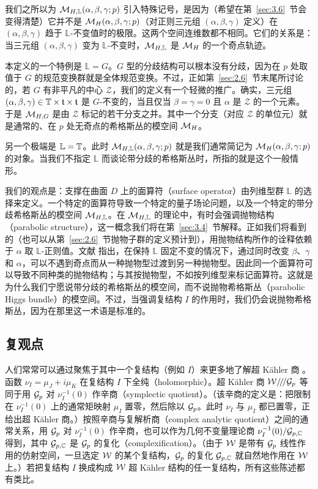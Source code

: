 我们之所以为 ${\mathcal{M}}_{H,\mathbb{L}}(\alpha,\beta,\gamma;p)$ 引入特殊记号，是因为（希望在第~\ref{sec:3.6}~节会变得清楚）它并不是 ${\mathcal{M}}_H(\alpha,\beta,\gamma;p)$（对正则三元组 $(\alpha,\beta,\gamma)$ 定义）在 $(\alpha,\beta,\gamma)$ 趋于 $\mathbb{L}$-不变值时的极限。这两个空间连维数都不相同。它们的关系是：当三元组 $(\alpha,\beta,\gamma)$ 变为 $\mathbb{L}$-不变时，${\mathcal{M}}_{H,\mathbb{L}}$ 是 ${{\mathcal{M}}_H}$ 的一个奇点轨迹。

本定义的一个特例是 $\mathbb{L}=G$。$G$ 型的分歧结构可以根本没有分歧，因为在 $p$ 处取值于 $G$ 的规范变换群就是全体规范变换。不过，正如第~\ref{sec:2.6}~节末尾所讨论的，若 $G$ 有非平凡的中心 ${\mathcal Z}$，我们的定义有一个轻微的推广。确实，三元组 $(\alpha,\beta,\gamma)
\in {\mathbb{T}}\times \mathfrak t\times \mathfrak t$ 是 $G$-不变的，当且仅当 $\beta=\gamma=0$ 且 $\alpha$ 是 ${\mathcal Z}$ 的一个元素。于是 ${\mathcal{M}}_{H,G}$ 是由 ${\mathcal Z}$ 标记的若干分支之并。其中一个分支（对应 $\mathcal Z$ 的单位元）就是通常的、在 $p$ 处无奇点的希格斯丛的模空间 ${{\mathcal{M}}_H}$。

另一个极端是 $\mathbb{L}={\mathbb{T}}$。此时 ${\mathcal{M}}_{H,\mathbb{L}}(\alpha,\beta,\gamma;p)$ 就是我们通常简记为 ${\mathcal{M}}_H(\alpha,\beta,\gamma;p)$ 的对象。当我们不指定 $\mathbb{L}$ 而谈论带分歧的希格斯丛时，所指的就是这个一般情形。

我们的观点是：支撑在曲面 $D$ 上的面算符（surface operator）由列维型群 $\mathbb{L}$ 的选择来定义。一个特定的面算符导致一个特定的量子场论问题，以及一个特定的带分歧希格斯丛的模空间 ${\mathcal{M}}_{H,\mathbb{L}}$。在 ${\mathcal{M}}_{H,\mathbb{L}}$ 的理论中，有时会强调抛物结构（parabolic structure），这一概念我们将在第~\ref{sec:3.4}~节解释。正如我们将看到的（也可以从第~\ref{sec:2.6}~节抛物子群的定义预计到），用抛物结构所作的诠释依赖于 $\alpha$ 取 $\mathbb{L}$-正则值。文献 \cite{ref24} 指出，在保持 $\mathbb{L}$ 固定不变的情况下，通过同时改变 $\beta$、$\gamma$ 和 $\alpha$，可以不遇到奇点而从一种抛物型过渡到另一种抛物型。因此同一个面算符可以导致不同种类的抛物结构；与其按抛物型，不如按列维型来标记面算符。这就是为什么我们宁愿说带分歧的希格斯丛的模空间，而不说抛物希格斯丛（parabolic Higgs bundle）的模空间。不过，当强调复结构 $I$ 的作用时，我们仍会说抛物希格斯丛，因为在那里这一术语是标准的。

\subsection{复观点}
\label{sec:3.2}

人们常常可以通过聚焦于其中一个复结构（例如 $I$）来更多地了解超 Kähler 商 \cite{ref49}。函数
 $\nu_I=\mu_J+i\mu_K$ 在复结构 $I$ 下全纯（holomorphic）。超 Kähler 商 $\mathcal{W}/\negthinspace/\negthinspace/\mathcal{G}_p$ 等同于用 $\mathcal{G}_p$ 对 $\nu_I^{-1}(0)$ 作辛商（symplectic quotient）。（该辛商的定义是：把限制在 $\nu_I^{-1}(0)$ 上的通常矩映射
$\mu_I$ 置零，然后除以 $\mathcal{G}_p$。此时 $\nu_I$ 与 $\mu_I$ 都已置零，正给出超 Kähler 商。）按照辛商与复解析商（complex analytic quotient）之间的通常关系，用 $\mathcal{G}_p$ 对 $\nu_I^{-1}(0)$ 作辛商，也可以作为几何不变量理论商 $\nu_I^{-1}(0)/\mathcal{G}_{p,{\mathbb{C}}}$ 得到，其中 $\mathcal{G}_{p,{\mathbb{C}}}$ 是 $\mathcal{G}_p$ 的复化（complexification）。（由于
$\mathcal{W}$ 是带有 $\mathcal{G}_p$ 线性作用的仿射空间，一旦选定 $\mathcal{W}$ 的某个复结构，$\mathcal{G}_p$ 的复化 $\mathcal{G}_{p,{\mathbb{C}}}$ 就自然地作用在 $\mathcal{W}$ 上。）若把复结构 $I$ 换成构成 $\mathcal{W}$ 超 Kähler 结构的任一复结构，所有这些陈述都有类比。

